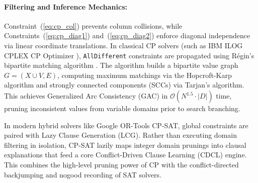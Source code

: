 \documentclass[a4paper,fleqn]{cas-sc}
\begin{document}
\paragraph{Filtering and Inference Mechanics:}
Constraint~(\ref{eq:cp_col}) prevents column collisions, while Constraints~(\ref{eq:cp_diag1}) and~(\ref{eq:cp_diag2}) enforce diagonal independence via linear coordinate translations. In classical CP solvers (such as IBM ILOG CPLEX CP Optimizer \cite{ibm2022cplex}), \texttt{AllDifferent} constraints are propagated using Régin's bipartite matching algorithm \cite{regin1994filtering}. The algorithm builds a bipartite value graph $G = (X \cup V, E)$, computing maximum matchings via the Hopcroft-Karp algorithm and strongly connected components (SCCs) via Tarjan's algorithm. This achieves Generalized Arc Consistency (GAC) in $\mathcal{O}(N^{1.5} \cdot |D|)$ time, pruning inconsistent values from variable domains prior to search branching.

In modern hybrid solvers like Google OR-Tools CP-SAT, global constraints are paired with Lazy Clause Generation (LCG). Rather than executing domain filtering in isolation, CP-SAT lazily maps integer domain prunings into clausal explanations that feed a core Conflict-Driven Clause Learning (CDCL) engine. This combines the high-level pruning power of CP with the conflict-directed backjumping and nogood recording of SAT solvers.
\end{document}
